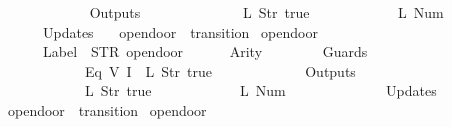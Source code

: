 \begin{isabellebody}
\ \ \ \ \ \ {\isacharbrackright}{\isacharcomma}\isanewline
\ \ \ \ \ \ Outputs\ {\isacharequal}\ {\isacharbrackleft}\isanewline
\ \ \ \ \ \ \ \ \ \ \ \ {\isacharparenleft}L\ {\isacharparenleft}Str\ {\isacharprime}{\isacharprime}true{\isacharprime}{\isacharprime}{\isacharparenright}{\isacharparenright}{\isacharcomma}\isanewline
\ \ \ \ \ \ \ \ \ \ \ \ {\isacharparenleft}L\ {\isacharparenleft}Num\ {}{\isacharparenright}{\isacharparenright}\isanewline
\ \ \ \ \ \ {\isacharbrackright}{\isacharcomma}\isanewline
\ \ \ \ \ \ Updates\ {\isacharequal}\ {\isacharbrackleft}{\isacharbrackright}\isanewline
{\isasymrparr}{\isachardoublequoteclose}\isanewline
\isanewline
{}\isamarkupfalse%
\ {\isachardoublequoteopen}opendoor{}{\isachardoublequoteclose}\ {\isacharcolon}{\isacharcolon}\ {\isachardoublequoteopen}transition{\isachardoublequoteclose}\ \isanewline
{\isachardoublequoteopen}opendoor{}\ {\isasymequiv}\ {\isasymlparr}\isanewline
\ \ \ \ \ \ Label\ {\isacharequal}\ STR\ {\isacharprime}{\isacharprime}opendoor{\isacharprime}{\isacharprime}{\isacharcomma}\isanewline
\ \ \ \ \ \ Arity\ {\isacharequal}\ {}{\isacharcomma}\isanewline
\ \ \ \ \ \ Guards\ {\isacharequal}\ {\isacharbrackleft}\isanewline
\ \ \ \ \ \ \ \ \ \ \ \ {\isacharparenleft}Eq\ {\isacharparenleft}V\ {\isacharparenleft}I\ {}{\isacharparenright}{\isacharparenright}\ {\isacharparenleft}L\ {\isacharparenleft}Str\ {\isacharprime}{\isacharprime}true{\isacharprime}{\isacharprime}{\isacharparenright}{\isacharparenright}{\isacharparenright}\isanewline
\ \ \ \ \ \ {\isacharbrackright}{\isacharcomma}\isanewline
\ \ \ \ \ \ Outputs\ {\isacharequal}\ {\isacharbrackleft}\isanewline
\ \ \ \ \ \ \ \ \ \ \ \ {\isacharparenleft}L\ {\isacharparenleft}Str\ {\isacharprime}{\isacharprime}true{\isacharprime}{\isacharprime}{\isacharparenright}{\isacharparenright}{\isacharcomma}\isanewline
\ \ \ \ \ \ \ \ \ \ \ \ {\isacharparenleft}L\ {\isacharparenleft}Num\ {}{\isacharparenright}{\isacharparenright}\isanewline
\ \ \ \ \ \ {\isacharbrackright}{\isacharcomma}\isanewline
\ \ \ \ \ \ Updates\ {\isacharequal}\ {\isacharbrackleft}{\isacharbrackright}\isanewline
{\isasymrparr}{\isachardoublequoteclose}\isanewline
\isanewline
{}\isamarkupfalse%
\ {\isachardoublequoteopen}opendoor{}{\isachardoublequoteclose}\ {\isacharcolon}{\isacharcolon}\ {\isachardoublequoteopen}transition{\isachardoublequoteclose}\ \isanewline
{\isachardoublequoteopen}opendoor{}\ {\isasymequiv}\ {\isasymlparr}\isanewline

\end{isabellebody}
